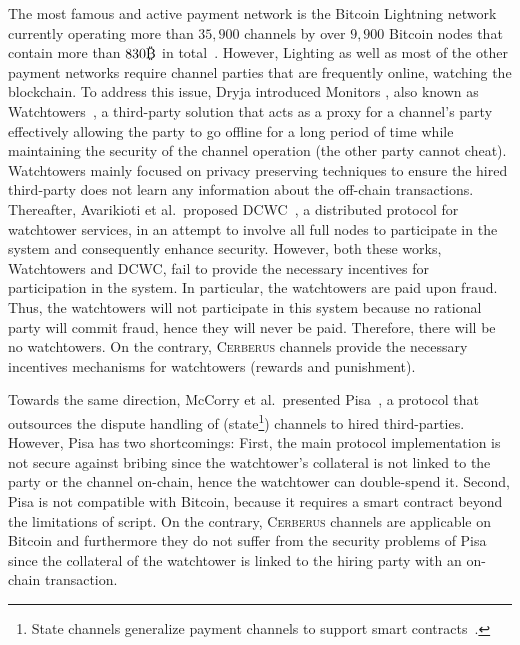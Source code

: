 \documentclass[runningheads]{llncs}
\newcommand{\authnote}[3]{{ \footnotesize \bf{#1[#2: #3]~}}} %
\newcommand{\edit}[1]{\authnote{\color{blue}}{edit}{#1}}
\def\bitcoin{%
  \leavevmode
  \vtop{\offinterlineskip %
    \setbox0=\hbox{B}%
    \setbox2=\hbox to\wd0{\hfil\hskip-.03em
    \vrule height .3ex width .15ex\hskip .08em
    \vrule height .3ex width .15ex\hfil}
    \vbox{\copy2\box0}\box2}}
\newcommand{\ie}{{\em i.e.}}
\newcommand{\sys}{\textsc{Cerberus}\xspace}
\begin{document}
The most famous and active payment network is the Bitcoin Lightning network \cite{poon2015lightning} currently operating more than $35,900$ channels by over $9,900$ Bitcoin nodes that contain more than $830\bitcoin$ in total~\cite{lightning-stats}. However, Lighting as well as most of the other payment networks require channel parties that are frequently online, watching the blockchain. To address this issue, Dryja introduced Monitors \cite{dryja2016monitors}, also known as Watchtowers~\cite{watchtowers}, a third-party solution that acts as a proxy for a channel's party effectively allowing the party to go offline for a long period of time while maintaining the security of the channel operation (the other party cannot cheat). Watchtowers mainly focused on privacy preserving techniques to ensure the hired third-party does not learn any information about the off-chain transactions.
Thereafter, Avarikioti et al.\ proposed DCWC~\cite{avarikioti2018watchtowers}, a distributed protocol for watchtower services, in an attempt to involve all full nodes to participate in the system and consequently enhance security.
However, both these works, Watchtowers and DCWC, fail to provide the necessary incentives for participation in the system. 
In particular, the watchtowers are paid upon fraud. Thus, the watchtowers will not participate in this system because no rational party will commit fraud, hence they will never be paid. Therefore, there will be no watchtowers.
On the contrary, \sys channels provide the necessary incentives mechanisms for watchtowers (rewards and punishment).

Towards the same direction, McCorry et al.\ presented Pisa~\cite{mccorry2018pisa}, a protocol that outsources the dispute handling of (state\footnote{State channels generalize payment channels to support smart contracts~\cite{Miller2017sprites}.}) channels to hired third-parties. However, Pisa has two shortcomings: First, the main protocol implementation is not secure against bribing since the watchtower's collateral is not linked to the party or the channel on-chain, hence the watchtower can double-spend it. Second, Pisa is not compatible with Bitcoin, because it requires a smart contract beyond the limitations of script. On the contrary, \sys channels are applicable on Bitcoin and furthermore they do not suffer from the security problems of Pisa since the collateral of the watchtower is linked to the hiring party with an on-chain transaction. 
\end{document}

